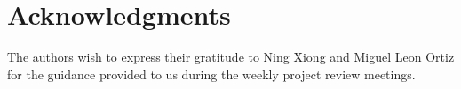 \section{Acknowledgments}
The authors wish to express their gratitude to Ning Xiong and Miguel Leon Ortiz
for the guidance provided to us during the weekly project review meetings.
